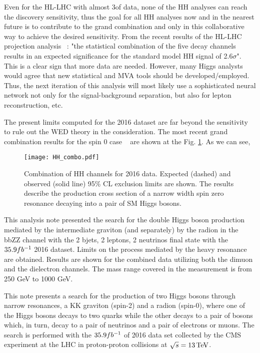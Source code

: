 Even for the HL-LHC with almost 3\abinv of data, none of the HH analyses can reach the discovery sensitivity, thus the goal for all HH analyses now and in the nearest future is to contribute to the grand combination and only in this collaborative way to achieve the desired sensitivity. From the recent results of the HL-LHC projection analysis ~\cite{CMS-PAS-FTR-18-019}: "the statistical combination of the five decay channels results in an expected significance for the standard model HH signal of 2.6$\sigma$". This is a clear sign that more data are needed. However, many Higgs analysts would agree that new statistical and MVA tools should be developed/employed. Thus, the next iteration of this analysis will most likely use a sophisticated neural network not only for the signal-background separation, but also for lepton reconstruction, etc. 

The present limits computed for the 2016 dataset are far beyond the sensitivity to rule out the WED theory in the consideration. The most recent grand combination results for the spin 0 case ~\cite{CMS-PAS-HIG-17-030} are shown at the Fig. \ref{HH_combo}. As we can see, 

\begin{figure}[H]%
  \begin{center}
    \texttt{[image: HH\_combo.pdf]}
    \caption{ Combination of HH channels for 2016 data. Expected (dashed) and observed (solid line) 95\% CL exclusion limits are shown. The results describe the production cross section of a narrow width spin zero resonance decaying into a pair of SM Higgs bosons.  }
    \label{HH_combo}
  \end{center}
\end{figure}










This analysis note presented the search for the double Higgs boson production mediated by the intermediate graviton (and separately) by the radion in the bbZZ channel with the 2 bjets, 2 leptons, 2 neutrinos final state with the $35.9fb^{-1}$ 2016 dataset. Limits on the process mediated by the heavy resonance are obtained. Results are shown for the combined data utilizing both the dimuon and the dielectron channels. The mass range covered in the measurement is from 250 GeV to 1000 GeV.

This note presents a search for the production of two Higgs bosons
through narrow resonances, a KK graviton (spin-2) and a radion (spin-0), where one of the Higgs bosons decays to
two \Pqb quarks while the other decays to a pair of \PZ bosons which, in
turn, decay to a pair of neutrinos and a pair of electrons or muons.
The search is performed with the $35.9fb^{-1}$ of 2016 data set
collected by the CMS experiment at the LHC in proton-proton collisions at
$\sqrt{s} = 13 \,\text{Te\hspace{-.08em}V}$.

